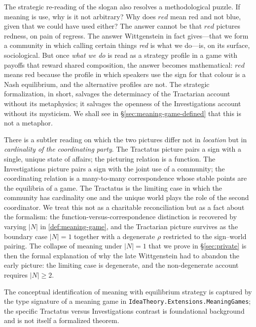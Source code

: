 The strategic re-reading of the slogan also resolves a methodological
puzzle. If meaning is use, why is it not arbitrary? Why does
$\textit{red}$ mean red and not blue, given that we could have used
either? The answer cannot be that $\textit{red}$ pictures redness, on
pain of regress. The answer Wittgenstein in fact gives---that we form
a community in which calling certain things \emph{red} is what we
do---is, on its surface, sociological. But once \emph{what we do} is
read as a strategy profile in a game with payoffs that reward shared
composition, the answer becomes mathematical: $\textit{red}$ means red
because the profile in which speakers use the sign for that colour is a
Nash equilibrium, and the alternative profiles are not. The strategic
formalization, in short, salvages the determinacy of the Tractarian
account without its metaphysics; it salvages the openness of the
Investigations account without its mysticism. We shall see in
\S\ref{sec:meaning-game-defined} that this is not a metaphor.

There is a subtler reading on which the two pictures differ not in
\emph{location} but in \emph{cardinality of the coordinating party}.
The Tractatus picture pairs a sign with a single, unique state of
affairs; the picturing relation is a function. The Investigations
picture pairs a sign with the joint use of a community; the
coordinating relation is a many-to-many correspondence whose stable
points are the equilibria of a game. The Tractatus is the limiting
case in which the community has cardinality one and the unique world
plays the role of the second coordinator. We treat this not as a
charitable reconciliation but as a fact about the formalism: the
function-versus-correspondence distinction is recovered by varying
$|N|$ in \cref{def:meaning-game}, and the Tractarian picture survives
as the boundary case $|N|=1$ together with a degenerate $\rho$
restricted to the sign--world pairing. The collapse of meaning under
$|N|=1$ that we prove in \S\ref{sec:private} is then the formal
explanation of why the late Wittgenstein had to abandon the early
picture: the limiting case is degenerate, and the non-degenerate
account requires $|N|\geq 2$.

\formalstatus The conceptual identification of meaning with equilibrium
strategy is captured by the type signature of a meaning game in
\texttt{IdeaTheory.Extensions.MeaningGames}; the specific Tractatus
versus Investigations contrast is foundational background and is not
itself a formalized theorem.

